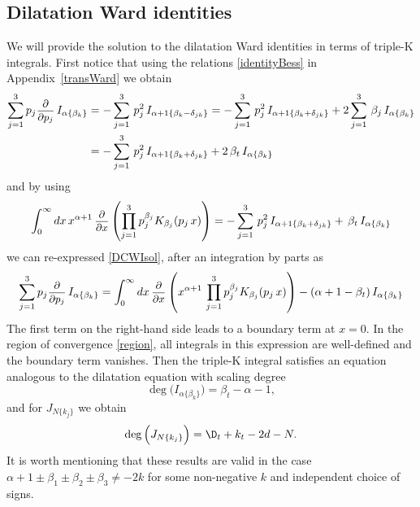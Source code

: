 \documentclass[a4paper,11pt,openright,twoside]{book}
\let\a=\alpha   \let\b=\beta   \let\g=\gamma   \let\d=\delta
\newcommand{\sdfrac}[2]{\mbox{\small$\displaystyle\frac{#1}{#2}$}}
\newcommand{\appref}[1]{Appendix~\ref{#1}}		%
\numberwithin{equation}{section}
\begin{document}
{{{\subsection{Dilatation Ward identities}

We will provide the solution to the dilatation Ward identities in terms of triple-K integrals. First notice that using the relations \eqref{identityBess} in \appref{transWard} we obtain
\begin{align}
	\sum_{j=1}^3p_j\sdfrac{\partial }{\partial p_j}\,I_{\a\{\b_k\}}&=-\sum_{j=1}^3\,p_j^2\,I_{\a+1\{\b_k-\d_{jk}\}}=-\sum_{j=1}^3\,p_j^2\,I_{\a+1\{\b_k+\d_{jk}\}}+2\sum_{j=1}^3\,\b_j\,I_{\a\{\b_k\}}\notag\\
	&=-\sum_{j=1}^3\,p_j^2\,I_{\a+1\{\b_k+\d_{jk}\}}+2\,\b_t\,I_{\a\{\b_k\}}\label{DCWIsol}
\end{align}
and by using
\begin{equation}
	\int_0^\infty dx\,x^{\a+1}\,\sdfrac{\partial}{\partial x}\left(\prod_{j=1}^{3}p_j^{\b_j}K_{\b_j}(p_j\,x)\right)=-\sum_{j=1}^3\,p_j^2\,I_{\a+1\{\b_k+\d_{jk}\}}+\,\b_t\,I_{\a\{\b_k\}}
\end{equation}
we can re-expressed \eqref{DCWIsol}, after an integration by parts as
\begin{equation}
	\sum_{j=1}^3p_j\sdfrac{\partial }{\partial p_j}\,I_{\a\{\b_k\}}=\int_0^\infty dx\,\sdfrac{\partial}{\partial x}\left(x^{\a+1}\,\prod_{j=1}^{3}p_j^{\b_j}K_{\b_j}(p_j\,x)\right)-(\a+1-\b_t)\,I_{\a\{\b_k\}}\label{DCWIsol2}
\end{equation}
The first term on the right-hand side leads to a boundary term at $x=0$. In the region of convergence \eqref{region}, all integrals in this expression are well-defined and the boundary term vanishes. Then the triple-K integral satisfies an equation analogous to the dilatation equation with scaling degree
\begin{equation}
	\deg\Big(I_{\a\{\b_k\}}\Big)=\b_t-\a-1,
\end{equation}
and for $J_{N\{k_j\}}$ we obtain
\begin{equation}
	\deg\Big({J_{N\{k_j\}}}\Big)=\D_t+k_t-2d-N.
\end{equation}
It is worth mentioning that these results are valid in the case $\a+1\pm\b_1\pm\b_2\pm\b_3\ne-2k$ for some non-negative $k$ and independent choice of signs.

}}}
\end{document}

